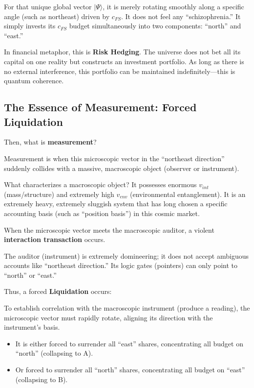 For that unique global vector $|\Psi\rangle$, it is merely rotating smoothly along a specific angle (such as northeast) driven by $c_{FS}$. It does not feel any ``schizophrenia.'' It simply invests its $c_{FS}$ budget simultaneously into two components: ``north'' and ``east.''

In financial metaphor, this is \textbf{Risk Hedging}. The universe does not bet all its capital on one reality but constructs an investment portfolio. As long as there is no external interference, this portfolio can be maintained indefinitely---this is quantum coherence.

\subsection{The Essence of Measurement: Forced Liquidation}

Then, what is \textbf{measurement}?

Measurement is when this microscopic vector in the ``northeast direction'' suddenly collides with a massive, macroscopic object (observer or instrument).

What characterizes a macroscopic object? It possesses enormous $v_{int}$ (mass/structure) and extremely high $v_{env}$ (environmental entanglement). It is an extremely heavy, extremely sluggish system that has long chosen a specific accounting basis (such as ``position basis'') in this cosmic market.

When the microscopic vector meets the macroscopic auditor, a violent \textbf{interaction transaction} occurs.

The auditor (instrument) is extremely domineering; it does not accept ambiguous accounts like ``northeast direction.'' Its logic gates (pointers) can only point to ``north'' or ``east.''

Thus, a forced \textbf{Liquidation} occurs:

To establish correlation with the macroscopic instrument (produce a reading), the microscopic vector must rapidly rotate, aligning its direction with the instrument's basis.

\begin{itemize}
\item It is either forced to surrender all ``east'' shares, concentrating all budget on ``north'' (collapsing to A).

\item Or forced to surrender all ``north'' shares, concentrating all budget on ``east'' (collapsing to B).
\end{itemize}

